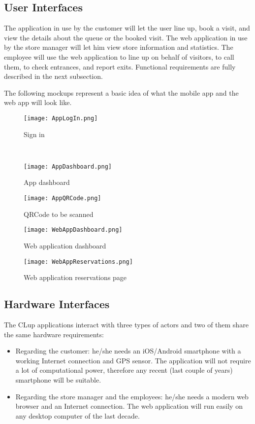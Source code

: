 \subsection{User Interfaces}
The application in use by the customer will let the user line up, book a visit, and view the details about the queue or the booked visit.
The web application in use by the store manager will let him view store information and statistics. The employee will use the web application to line up on behalf of visitors, to call them, to check entrances, and report exits. Functional requirements are fully described in the next subsection. 

The following mockups represent a basic idea of what the mobile app and the web app will look like.

\begin{figure}[H]
    \begin{minipage}[b]{8cm}
    \centering
    \texttt{[image: AppLogIn.png]}
    \caption{Sign in}
    \end{minipage}
    \ \hspace{2mm} \hspace{3mm} \
    \begin{minipage}[b]{8cm}
    \centering
    \texttt{[image: AppDashboard.png]}
    \caption{App dashboard}
    \end{minipage}
\end{figure}

\begin{figure}[H]
    \centering
    \texttt{[image: AppQRCode.png]}
    \caption{QRCode to be scanned}
\end{figure}

\begin{figure}[H]
    \centering
    \texttt{[image: WebAppDashboard.png]}
    \caption{Web application dashboard}
\end{figure}

\begin{figure}[H]
    \centering
    \texttt{[image: WebAppReservations.png]}
    \caption{Web application reservations page}
\end{figure}

\subsection{Hardware Interfaces}
\label{hardware interfaces}
The CLup applications interact with three types of actors and two of them share the same hardware requirements:
\begin{itemize}
    \item Regarding the customer: he/she needs an iOS/Android smartphone with a working Internet connection and GPS sensor. The application will not require a lot of computational power, therefore any recent (last couple of years) smartphone will be suitable.
    \item Regarding the store manager and the employees: he/she needs a modern web browser and an Internet connection. The web application will run easily on any desktop computer of the last decade.
\end{itemize}

